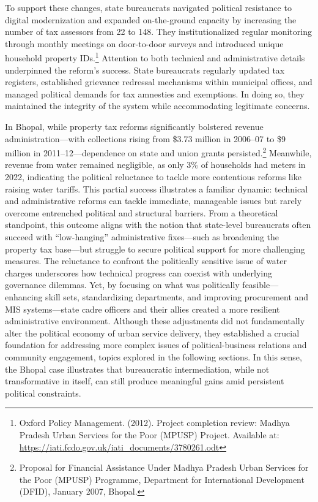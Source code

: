 To support these changes, state bureaucrats navigated political resistance to digital modernization and expanded on-the-ground capacity by increasing the number of tax assessors from 22 to 148. They institutionalized regular monitoring through monthly meetings on door-to-door surveys and introduced unique household property IDs.\footnote{Oxford Policy Management. (2012). Project completion review: Madhya Pradesh Urban Services for the Poor (MPUSP) Project. Available at: \url{https://iati.fcdo.gov.uk/iati_documents/3780261.odt}} Attention to both technical and administrative details underpinned the reform’s success. State bureaucrats regularly updated tax registers, established grievance redressal mechanisms within municipal offices, and managed political demands for tax amnesties and exemptions. In doing so, they maintained the integrity of the system while accommodating legitimate concerns.


In Bhopal, while property tax reforms significantly bolstered revenue administration—with collections rising from \$3.73 million in 2006–07 to \$9 million in 2011–12—dependence on state and union grants persisted.\footnote{Proposal for Financial Assistance Under Madhya Pradesh Urban Services for the Poor (MPUSP) Programme, Department for International Development (DFID), January 2007, Bhopal.} Meanwhile, revenue from water remained negligible, as only 3\% of households had meters in 2022, indicating the political reluctance to tackle more contentious reforms like raising water tariffs. This partial success illustrates a familiar dynamic: technical and administrative reforms can tackle immediate, manageable issues but rarely overcome entrenched political and structural barriers. From a theoretical standpoint, this outcome aligns with the notion that state-level bureaucrats often succeed with “low-hanging” administrative fixes—such as broadening the property tax base—but struggle to secure political support for more challenging measures. The reluctance to confront the politically sensitive issue of water charges underscores how technical progress can coexist with underlying governance dilemmas. Yet, by focusing on what was politically feasible—enhancing skill sets, standardizing departments, and improving procurement and MIS systems—state cadre officers and their allies created a more resilient administrative environment. Although these adjustments did not fundamentally alter the political economy of urban service delivery, they established a crucial foundation for addressing more complex issues of political-business relations and community engagement, topics explored in the following sections. In this sense, the Bhopal case illustrates that bureaucratic intermediation, while not transformative in itself, can still produce meaningful gains amid persistent political constraints.


